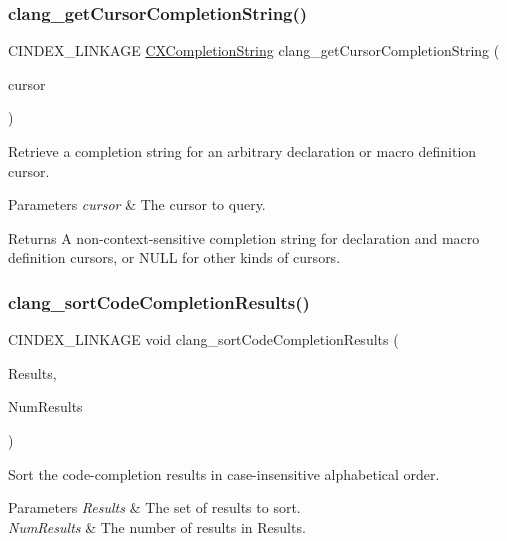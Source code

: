 \subsubsection{\texorpdfstring{clang\+\_\+get\+Cursor\+Completion\+String()}{clang\_getCursorCompletionString()}}
{\footnotesize\ttfamily C\+I\+N\+D\+E\+X\+\_\+\+L\+I\+N\+K\+A\+GE \mbox{\hyperlink{group__CINDEX__CODE__COMPLET_gafea23a43a60ec3b4f3bedccfbb76883a}{C\+X\+Completion\+String}} clang\+\_\+get\+Cursor\+Completion\+String (\begin{DoxyParamCaption}\item[{\mbox{\hyperlink{structCXCursor}{C\+X\+Cursor}}}]{cursor }\end{DoxyParamCaption})}



Retrieve a completion string for an arbitrary declaration or macro definition cursor. 


\begin{DoxyParams}{Parameters}
{\em cursor} & The cursor to query.\\
\hline
\end{DoxyParams}
\begin{DoxyReturn}{Returns}
A non-\/context-\/sensitive completion string for declaration and macro definition cursors, or N\+U\+LL for other kinds of cursors. 
\end{DoxyReturn}
\mbox{\label{group__CINDEX__CODE__COMPLET_gaf2625ffd90004cf3202c7f9112eb3fe7}} 
\subsubsection{\texorpdfstring{clang\+\_\+sort\+Code\+Completion\+Results()}{clang\_sortCodeCompletionResults()}}
{\footnotesize\ttfamily C\+I\+N\+D\+E\+X\+\_\+\+L\+I\+N\+K\+A\+GE void clang\+\_\+sort\+Code\+Completion\+Results (\begin{DoxyParamCaption}\item[{\mbox{\hyperlink{structCXCompletionResult}{C\+X\+Completion\+Result}} $\ast$}]{Results,  }\item[{unsigned}]{Num\+Results }\end{DoxyParamCaption})}



Sort the code-\/completion results in case-\/insensitive alphabetical order. 


\begin{DoxyParams}{Parameters}
{\em Results} & The set of results to sort. \\
\hline
{\em Num\+Results} & The number of results in {\ttfamily Results}. \\
\hline
\end{DoxyParams}
